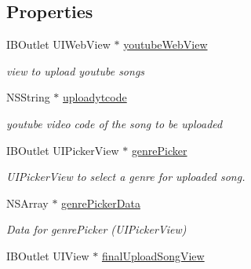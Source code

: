 \subsection*{Properties}
\begin{DoxyCompactItemize}
\item 
\hypertarget{interface_c_b_h_view_controller_a463820dea5eb85e6d2275a8ea9c69fbf}{I\-B\-Outlet U\-I\-Web\-View $\ast$ \hyperlink{interface_c_b_h_view_controller_a463820dea5eb85e6d2275a8ea9c69fbf}{youtube\-Web\-View}}\label{interface_c_b_h_view_controller_a463820dea5eb85e6d2275a8ea9c69fbf}

\begin{DoxyCompactList}\small\item\em view to upload youtube songs \end{DoxyCompactList}\item 
\hypertarget{interface_c_b_h_view_controller_a957f415cf4ea49ddcb4b00d5c4c7881e}{N\-S\-String $\ast$ \hyperlink{interface_c_b_h_view_controller_a957f415cf4ea49ddcb4b00d5c4c7881e}{uploadytcode}}\label{interface_c_b_h_view_controller_a957f415cf4ea49ddcb4b00d5c4c7881e}

\begin{DoxyCompactList}\small\item\em youtube video code of the song to be uploaded \end{DoxyCompactList}\item 
\hypertarget{interface_c_b_h_view_controller_ae5b2756df0c2a7615601923043519dea}{I\-B\-Outlet U\-I\-Picker\-View $\ast$ \hyperlink{interface_c_b_h_view_controller_ae5b2756df0c2a7615601923043519dea}{genre\-Picker}}\label{interface_c_b_h_view_controller_ae5b2756df0c2a7615601923043519dea}

\begin{DoxyCompactList}\small\item\em U\-I\-Picker\-View to select a genre for uploaded song. \end{DoxyCompactList}\item 
\hypertarget{interface_c_b_h_view_controller_a42054403ea069b1f964e74a08fc429a9}{N\-S\-Array $\ast$ \hyperlink{interface_c_b_h_view_controller_a42054403ea069b1f964e74a08fc429a9}{genre\-Picker\-Data}}\label{interface_c_b_h_view_controller_a42054403ea069b1f964e74a08fc429a9}

\begin{DoxyCompactList}\small\item\em Data for genre\-Picker (U\-I\-Picker\-View) \end{DoxyCompactList}\item 
\hypertarget{interface_c_b_h_view_controller_a0b3711ade53cab7f4dedffb3bfd1a4c3}{I\-B\-Outlet U\-I\-View $\ast$ \hyperlink{interface_c_b_h_view_controller_a0b3711ade53cab7f4dedffb3bfd1a4c3}{final\-Upload\-Song\-View}}\label{interface_c_b_h_view_controller_a0b3711ade53cab7f4dedffb3bfd1a4c3}


\end{DoxyCompactItemize}
